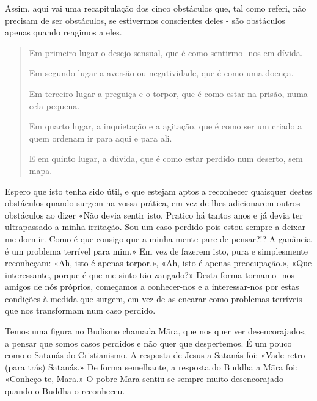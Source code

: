 Assim, aqui vai uma recapitulação dos cinco obstáculos que, tal como
referi, não precisam de ser obstáculos, se estivermos conscientes deles
- são obstáculos apenas quando reagimos a eles.

\begin{quote}
  Em primeiro lugar o desejo sensual, que é como sentirmo-\linebreak -nos em dívida.

  Em segundo lugar a aversão ou negatividade, que é como uma doença.

  Em terceiro lugar a preguiça e o torpor, que é como estar na prisão, numa cela pequena.

  Em quarto lugar, a inquietação e a agitação, que é como ser um criado a quem ordenam ir para aqui e para ali.

  E em quinto lugar, a dúvida, que é como estar perdido num deserto, sem mapa.
\end{quote}

Espero que isto tenha sido útil, e que estejam aptos a reconhecer
quaisquer destes obstáculos quando surgem na vossa prática, em vez de
lhes adicionarem outros obstáculos ao dizer «Não devia sentir isto.
Pratico há tantos anos e já devia ter ultrapassado a minha irritação.
Sou um caso perdido pois estou sempre a deixar-\linebreak-me dormir. Como é que
consigo que a minha mente pare de pensar?!? A ganância é um problema
terrível para mim.» Em vez de fazerem isto, pura e simplesmente
reconheçam: «Ah, isto é apenas torpor.», «Ah, isto é apenas
preocupação.», «Que interessante, porque é que me sinto tão zangado?»
Desta forma tornamo-\linebreak-nos amigos de nós próprios, começamos a \mbox{conhecer-nos}
e a interessar-nos por estas condições à medida que surgem, em vez de as
encarar como problemas terríveis que nos transformam num caso perdido.

Temos uma figura no Budismo chamada Māra, que nos quer ver
desencorajados, a pensar que somos casos perdidos e não quer que
despertemos. É um pouco como o Satanás do Cristianismo. A resposta de
Jesus a Satanás foi: «Vade retro (para trás) Satanás.» De forma
semelhante, a resposta do Buddha a Māra foi: «Conheço-te, Māra.» O pobre
Māra sentiu-se sempre muito desencorajado quando o Buddha o reconheceu.

